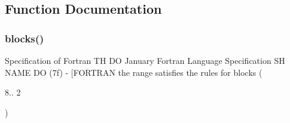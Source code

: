 \subsection{Function Documentation}
\mbox{\label{do_87_8txt_addf9a264ccc8c65a4995cf34906eff5c}} 
\subsubsection{\texorpdfstring{blocks()}{blocks()}}
{\footnotesize\ttfamily Specification of Fortran TH DO January Fortran Language Specification SH N\+A\+ME DO (7f) -\/ \mbox{[}\+F\+O\+R\+T\+R\+A\+N the range satisfies the rules for blocks (\begin{DoxyParamCaption}\item[{8.\+1.}]{2 }\end{DoxyParamCaption})}

\mbox{\label{do_87_8txt_aec67685fc467311079a688489f5e96ca}} 
